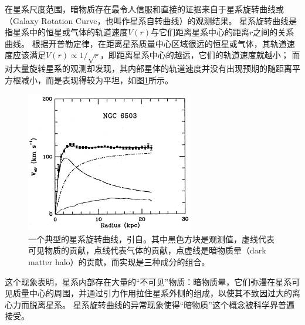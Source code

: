 在星系尺度范围，暗物质存在最令人信服和直接的证据来自于星系旋转曲线或（Galaxy Rotation Curve，也叫作星系自转曲线）的观测结果。
星系旋转曲线是指星系中的恒星或气体的轨道速度$V(r)$与它们距离星系中心的距离$r$之间的关系曲线。
根据开普勒定律，在距离星系质量中心区域很远的恒星或气体，其轨道速度应该满足$V(r)\propto 1/\sqrt{r}$，即距离星系中心的越远，它们的轨道速度就越小；
而对大量旋转星系的观测\cite{rubin1980rotational}却发现，其内部星体的轨道速度并没有出现预期的随距离平方根减小，而是表现得较为平坦，如图\ref{fig:introduction:rotation_curve}所示。
\begin{figure}[htbp]
	\centering
	\includegraphics[width=0.65\textwidth]{chap/introduction/fig/rotation_curve.png}
	\caption{一个典型的星系旋转曲线，引自\cite{begeman_extended_1991}。其中黑色方块是观测值，虚线代表可见物质的贡献，点线代表气体的贡献，点虚线是暗物质晕（dark matter halo）的贡献，而实现是三种成分的组合。}
	\label{fig:introduction:rotation_curve}
\end{figure}
这个现象表明，星系内部存在大量的“不可见”物质：暗物质晕，它们弥漫在星系可见质量中心的周围，并通过引力作用拉住星系外侧的组成，以使其不致因过大的离心力而脱离星系\cite{bosma1978distribution}。
星系旋转曲线的异常现象使得“暗物质”这个概念被科学界普遍接受。

